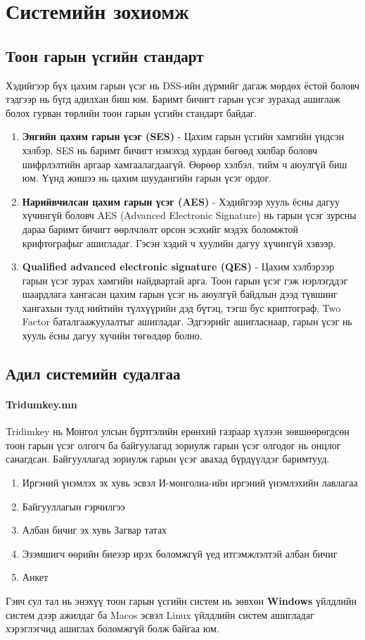 \chapter{Системийн зохиомж}
\section{Тоон гарын үсгийн стандарт}
Хэдийгээр бүх цахим гарын үсэг нь DSS-ийн дүрмийг дагаж мөрдөх ёстой боловч тэдгээр нь бүгд адилхан биш юм. Баримт бичигт гарын үсэг зурахад ашиглаж болох гурван төрлийн тоон гарын үсгийн стандарт байдаг.
\begin{enumerate}
	\item \textbf{Энгийн цахим гарын үсэг (SES)} - Цахим гарын үсгийн хамгийн үндсэн хэлбэр. SES нь баримт бичигт нэмэхэд хурдан бөгөөд хялбар боловч шифрлэлтийн аргаар хамгаалагдаагүй. Өөрөөр хэлбэл, тийм ч аюулгүй биш юм. Үүнд жишээ нь цахим шуудангийн гарын үсэг ордог.
	\item \textbf{Нарийвчилсан цахим гарын үсэг (AES)} - Хэдийгээр хууль ёсны дагуу хүчингүй боловч AES (Advanced Electronic Signature) нь гарын үсэг зурсны дараа баримт бичигт өөрлчлөлт орсон эсэхийг мэдэх боломжтой крифтографыг ашигладаг. Гэсэн хэдий ч хуулийн дагуу хүчингүй хэвээр.
	\item \textbf{Qualified advanced electronic signature (QES)} - Цахим хэлбэрээр гарын үсэг зурах хамгийн найдвартай арга. Тоон гарын үсэг гэж нэрлэгддэг шаардлага хангасан цахим гарын үсэг нь аюулгүй байдлын дээд түвшинг хангахын тулд нийтийн түлхүүрийн дэд бүтэц, тэгш бус криптограф, Two Factor баталгаажуулалтыг ашигладаг. Эдгээрийг ашигласнаар, гарын үсэг нь хууль ёсны дагуу хүчийн төгөлдөр болно.
\end{enumerate}
\section{Адил системийн судалгаа}
\subsubsection{Tridumkey.mn}
Tridimkey нь Монгол улсын бүртгэлийн ерөнхий газраар хүлээн зөвшөөрөгдсөн тоон гарын үсэг олгогч ба байгуулагад зориулж гарын үсэг олгодог нь онцлог санагдсан. Байгууллагад зориулж гарын үсэг авахад бүрдүүлдэг баримтууд.
\begin{enumerate}
	\item Иргэний үнэмлэх эх хувь эсвэл И-монголиа-ийн иргэний  үнэмлэхийн лавлагаа
	\item Байгууллагын гэрчилгээ
	\item Албан бичиг эх хувь		Загвар татах
	\item Эзэмшигч өөрийн биеээр ирэх боломжгүй үед итгэмжлэлтэй албан бичиг
	\item Анкет
\end{enumerate}
Гэвч сул тал нь энэхүү тоон гарын үсгийн систем нь зөвхөн \textbf{Windows} үйлдлийн систем дээр ажилдаг ба Macos эсвэл Linux үйлдлийн систем ашигладаг хэрэглэгчид ашиглах боломжгүй болж байгаа юм.
